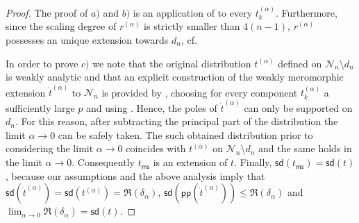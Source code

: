 \documentclass[10pt]{book}
\newcommand{\pp}{\mathsf{pp}}
\newcommand{\ms}{\mathsf{ms}}
\newcommand{\sd}{\mathsf{sd}}
\newcommand{\Ncal}{\mathcal{N}}
\theoremstyle{break}
\newtheorem{proof}{Proof}
\begin{document}
\begin{proof}
The proof of $a)$ and $b)$ is an application of %
to every $t^{(\alpha)}_k$. Furthermore, since the scaling degree of $r^{(\alpha)}$ is strictly smaller than $4(n-1)$, $r^{(\alpha)}$ possesses an unique extension towards $d_n$, cf. %

In order to prove $c)$ we note that the original distribution $t^{(\alpha)}$ defined on $\Ncal_n\setminus d_n$ is weakly analytic and that an explicit construction of the weakly meromorphic extension $\dot{t}^{(\alpha)}$ to $\Ncal_n$ is provided by 
, choosing for every component $t^{(\alpha)}_k$ a sufficiently large $p$ and using %
. Hence, the poles of $\dot{t}^{(\alpha)}$ can only be supported on $d_n$. For this reason, after subtracting the principal part of the distribution the limit $\alpha \to 0$ can be safely taken. The such obtained distribution prior to considering the limit $\alpha \to 0$ coincides with $t^{(\alpha)}$ on $\Ncal_n\setminus d_n$ and the same holds in the limit $\alpha\to 0$. Consequently $t_\ms$ is an extension of $t$. Finally, $\sd(t_\ms)=\sd(t)$, because our assumptions and the above analysis imply that $\sd(\dot{t}^{(\alpha)})=\sd(t^{(\alpha)})=\Re(\delta_\alpha)$, $\sd(\pp(\dot{t}^{(\alpha)}))\le \Re(\delta_\alpha)$ and $\lim_{\alpha\to 0}\Re(\delta_\alpha) = \sd(t)$.
\end{proof}
\end{document}
